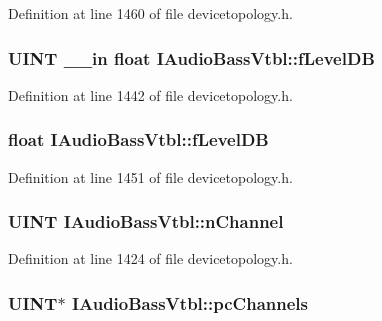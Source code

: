 Definition at line 1460 of file devicetopology.\+h.

\subsubsection[{\texorpdfstring{f\+Level\+DB}{fLevelDB}}]{ {\bf U\+I\+NT} {\bf \+\_\+\+\_\+in} float I\+Audio\+Bass\+Vtbl\+::f\+Level\+DB}\hypertarget{struct_i_audio_bass_vtbl_afcba7f7353352beee21ed1b8c4b320eb}{}\label{struct_i_audio_bass_vtbl_afcba7f7353352beee21ed1b8c4b320eb}


Definition at line 1442 of file devicetopology.\+h.

\subsubsection[{\texorpdfstring{f\+Level\+DB}{fLevelDB}}]{ float I\+Audio\+Bass\+Vtbl\+::f\+Level\+DB}\hypertarget{struct_i_audio_bass_vtbl_a4759ce1b03a0d6babbdfe7d7a6eab833}{}\label{struct_i_audio_bass_vtbl_a4759ce1b03a0d6babbdfe7d7a6eab833}


Definition at line 1451 of file devicetopology.\+h.

\subsubsection[{\texorpdfstring{n\+Channel}{nChannel}}]{ {\bf U\+I\+NT} I\+Audio\+Bass\+Vtbl\+::n\+Channel}\hypertarget{struct_i_audio_bass_vtbl_a16637a1830c04b2c29177f7e8f17cc65}{}\label{struct_i_audio_bass_vtbl_a16637a1830c04b2c29177f7e8f17cc65}


Definition at line 1424 of file devicetopology.\+h.

\subsubsection[{\texorpdfstring{pc\+Channels}{pcChannels}}]{ {\bf U\+I\+NT}$\ast$ I\+Audio\+Bass\+Vtbl\+::pc\+Channels}\hypertarget{struct_i_audio_bass_vtbl_a0a1570513759888e0089c78d2160f2e6}{}\label{struct_i_audio_bass_vtbl_a0a1570513759888e0089c78d2160f2e6}


